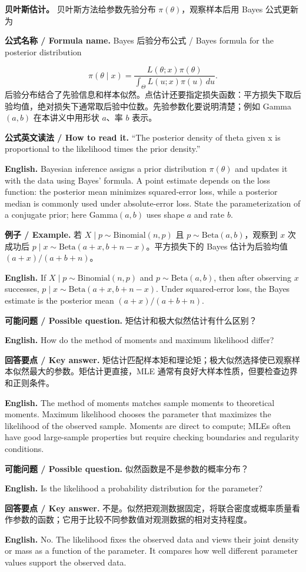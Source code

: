 \documentclass[UTF8,11pt,a4paper]{ctexart}
\newcommand{\EN}[1]{\par\noindent\textbf{English.} #1\par}
\newcommand{\READ}[1]{\par\noindent\textbf{公式英文读法 / How to read it.} #1\par}
\newcommand{\FORMULA}[2]{\par\noindent\textbf{公式名称 / Formula name.} #1 / #2\par}
\newcommand{\EX}[2]{\par\noindent\textbf{例子 / Example.} #1\par\EN{#2}}
\newcommand{\ASK}[4]{\par\noindent\textbf{可能问题 / Possible question.} #1\par\EN{#2}\noindent\textbf{回答要点 / Key answer.} #3\par\EN{#4}\medskip}
\begin{document}
\noindent\textbf{贝叶斯估计。} 贝叶斯方法给参数先验分布 $\pi(\theta)$，观察样本后用 Bayes 公式更新为
\FORMULA{Bayes 后验分布公式}{Bayes formula for the posterior distribution}
\[
\pi(\theta\mid x)=\frac{L(\theta;x)\pi(\theta)}
{\int_\Theta L(u;x)\pi(u)\,du}.
\]
后验分布结合了先验信息和样本似然。点估计还要指定损失函数：平方损失下取后验均值，绝对损失下通常取后验中位数。先验参数化要说明清楚；例如 Gamma$(a,b)$ 在本讲义中用形状 $a$、率 $b$ 表示。
\READ{“The posterior density of theta given x is proportional to the likelihood times the prior density.”}
\EN{Bayesian inference assigns a prior distribution $\pi(\theta)$ and updates it with the data using Bayes' formula. A point estimate depends on the loss function: the posterior mean minimizes squared-error loss, while a posterior median is commonly used under absolute-error loss. State the parameterization of a conjugate prior; here Gamma$(a,b)$ uses shape $a$ and rate $b$.}

\EX{若 $X\mid p\sim\mathrm{Binomial}(n,p)$ 且 $p\sim\mathrm{Beta}(a,b)$，观察到 $x$ 次成功后 $p\mid x\sim\mathrm{Beta}(a+x,b+n-x)$。平方损失下的 Bayes 估计为后验均值 $(a+x)/(a+b+n)$。}{If $X\mid p\sim\mathrm{Binomial}(n,p)$ and $p\sim\mathrm{Beta}(a,b)$, then after observing $x$ successes, $p\mid x\sim\mathrm{Beta}(a+x,b+n-x)$. Under squared-error loss, the Bayes estimate is the posterior mean $(a+x)/(a+b+n)$.}

\ASK{矩估计和极大似然估计有什么区别？}{How do the method of moments and maximum likelihood differ?}{矩估计匹配样本矩和理论矩；极大似然选择使已观察样本似然最大的参数。矩估计更直接，MLE 通常有良好大样本性质，但要检查边界和正则条件。}{The method of moments matches sample moments to theoretical moments. Maximum likelihood chooses the parameter that maximizes the likelihood of the observed sample. Moments are direct to compute; MLEs often have good large-sample properties but require checking boundaries and regularity conditions.}

\ASK{似然函数是不是参数的概率分布？}{Is the likelihood a probability distribution for the parameter?}{不是。似然把观测数据固定，将联合密度或概率质量看作参数的函数；它用于比较不同参数值对观测数据的相对支持程度。}{No. The likelihood fixes the observed data and views their joint density or mass as a function of the parameter. It compares how well different parameter values support the observed data.}
\end{document}
